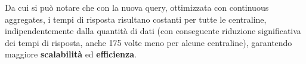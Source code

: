 Da cui si può notare che con la nuova query, ottimizzata con continuous aggregates, i tempi di risposta risultano costanti per tutte le centraline, indipendentemente dalla quantità di dati (con conseguente riduzione significativa dei tempi di risposta, anche 175 volte meno per alcune centraline), garantendo maggiore \textbf{scalabilità} ed \textbf{efficienza}.
